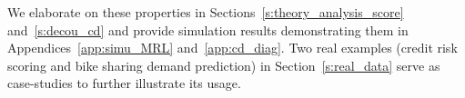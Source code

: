 \documentclass[twoside,11pt]{article}
\begin{document}




We elaborate on these properties in Sections~\ref{s:theory_analysis_score} and~\ref{s:decou_cd} and provide simulation results demonstrating them in Appendices~\ref{app:simu_MRL} and~\ref{app:cd_diag}. Two real examples (credit risk scoring and bike sharing demand prediction) in Section~\ref{s:real_data} serve as case-studies to further illustrate its usage.
\end{document}
